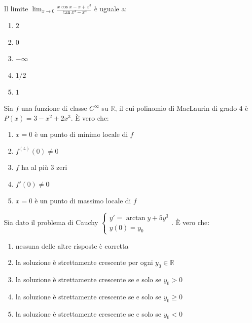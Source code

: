 \begin{quiz}
Il limite $\displaystyle\lim_{x\to0}\frac{x\cos x-x+x^3}{\tan x^3-x^4}$ \`e uguale a:
\begin{enumerate}
\item $2$
\item $0$
\item $-\infty$
\item $1/2$
\item $1$
\end{enumerate}
\end{quiz}

\begin{quiz}
Sia $f$ una funzione di classe $C^\infty$ su $\mathbb R$, il cui polinomio di MacLaurin di grado $4$ \`e $P(x)=3-x^2+2x^3$. \`E vero che:
\begin{enumerate}
\item $x=0$ \`e un punto di minimo locale di $f$
\item $f^{(4)}(0)\ne0$
\item $f$ ha al pi\`u $3$ zeri
\item $f\prime(0)\ne0$
\item $x=0$ \`e un punto di massimo locale di $f$
\end{enumerate}
\end{quiz}

\begin{quiz}
Sia dato il problema di Cauchy $\begin{cases}y\prime=\arctan y+5y^3\\y(0)=y_0\end{cases}$. \`E vero che:
\begin{enumerate}
\item nessuna delle altre risposte \`e corretta
\item la soluzione \`e strettamente crescente per ogni $y_0\in\mathbb R$
\item la soluzione \`e strettamente crescente se e solo se $y_0>0$
\item la soluzione \`e strettamente crescente se e solo se $y_0\ge0$
\item la soluzione \`e strettamente crescente se e solo se $y_0<0$
\end{enumerate}
\end{quiz}

